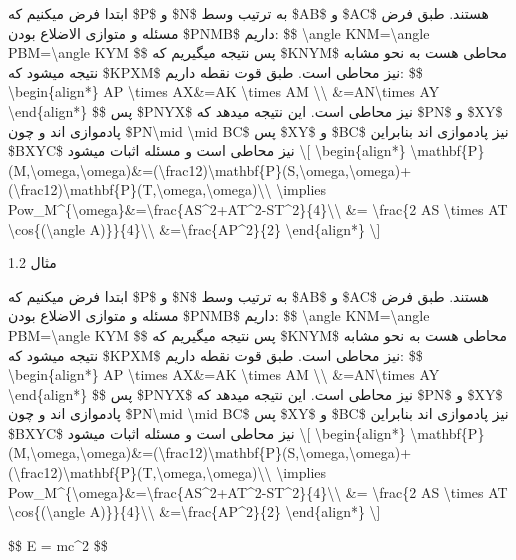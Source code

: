 ابتدا فرض میکنیم که \$P\$ و \$N\$ به ترتیب وسط \$AB\$ و \$AC\$ هستند.
طبق فرض مسئله و متوازی الاضلاع بودن \$PNMB\$ داریم: \$\$
\textbackslash angle KNM=\textbackslash angle PBM=\textbackslash angle
KYM \$\$ پس نتیجه میگیریم که \$KNYM\$ محاطی هست به نحو مشابه نتیجه میشود
که \$KPXM\$ نیز محاطی است. طبق قوت نقطه داریم: \$\$
\textbackslash begin\{align*\} AP \textbackslash times AX\&=AK
\textbackslash times AM \textbackslash\textbackslash{}
\&=AN\textbackslash times AY \textbackslash end\{align*\} \$\$ پس
\$PNYX\$ نیز محاطی است. این نتیجه میدهد که \$PN\$ و \$XY\$ پادموازی اند
و چون \$PN\textbackslash mid \textbackslash mid BC\$ پس \$XY\$ و \$BC\$
نیز پادموازی اند بنابراین \$BXYC\$ نیز محاطی است و مسئله اثبات میشود
\textbackslash{[} \textbackslash begin\{align*\}
\textbackslash mathbf\{P\}(M,\textbackslash omega\textquotesingle,\textbackslash omega)\&=(\textbackslash frac12)\textbackslash mathbf\{P\}(S,\textbackslash omega\textquotesingle,\textbackslash omega)+(\textbackslash frac12)\textbackslash mathbf\{P\}(T,\textbackslash omega\textquotesingle,\textbackslash omega)\textbackslash\textbackslash{}
\textbackslash implies
Pow\_M\^{}\{\textbackslash omega\textquotesingle\}\&=\textbackslash frac\{AS\^{}2+AT\^{}2-ST\^{}2\}\{4\}\textbackslash\textbackslash{}
\&= \textbackslash frac\{2 AS \textbackslash times AT
\textbackslash cos\{(\textbackslash angle
A)\}\}\{4\}\textbackslash\textbackslash{}
\&=\textbackslash frac\{AP\^{}2\}\{2\} \textbackslash end\{align*\}
\textbackslash{]}

مثال 1.2

ابتدا فرض میکنیم که \$P\$ و \$N\$ به ترتیب وسط \$AB\$ و \$AC\$ هستند.
طبق فرض مسئله و متوازی الاضلاع بودن \$PNMB\$ داریم: \$\$
\textbackslash angle KNM=\textbackslash angle PBM=\textbackslash angle
KYM \$\$ پس نتیجه میگیریم که \$KNYM\$ محاطی هست به نحو مشابه نتیجه میشود
که \$KPXM\$ نیز محاطی است. طبق قوت نقطه داریم: \$\$
\textbackslash begin\{align*\} AP \textbackslash times AX\&=AK
\textbackslash times AM \textbackslash\textbackslash{}
\&=AN\textbackslash times AY \textbackslash end\{align*\} \$\$ پس
\$PNYX\$ نیز محاطی است. این نتیجه میدهد که \$PN\$ و \$XY\$ پادموازی اند
و چون \$PN\textbackslash mid \textbackslash mid BC\$ پس \$XY\$ و \$BC\$
نیز پادموازی اند بنابراین \$BXYC\$ نیز محاطی است و مسئله اثبات میشود
\textbackslash{[} \textbackslash begin\{align*\}
\textbackslash mathbf\{P\}(M,\textbackslash omega\textquotesingle,\textbackslash omega)\&=(\textbackslash frac12)\textbackslash mathbf\{P\}(S,\textbackslash omega\textquotesingle,\textbackslash omega)+(\textbackslash frac12)\textbackslash mathbf\{P\}(T,\textbackslash omega\textquotesingle,\textbackslash omega)\textbackslash\textbackslash{}
\textbackslash implies
Pow\_M\^{}\{\textbackslash omega\textquotesingle\}\&=\textbackslash frac\{AS\^{}2+AT\^{}2-ST\^{}2\}\{4\}\textbackslash\textbackslash{}
\&= \textbackslash frac\{2 AS \textbackslash times AT
\textbackslash cos\{(\textbackslash angle
A)\}\}\{4\}\textbackslash\textbackslash{}
\&=\textbackslash frac\{AP\^{}2\}\{2\} \textbackslash end\{align*\}
\textbackslash{]}

{\$\$ E = mc\^{}2 \$\$}

